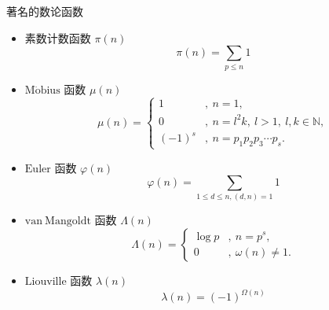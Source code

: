 \begin{example}{著名的数论函数}
\begin{itemize}
\item 素数计数函数 $\pi(n)$
\begin{equation}
\pi(n)=\sum_{p\leq n} 1
\end{equation}
\item $\mathrm{M\ddot{o}bius}$ 函数 $\mu(n)$
\begin{equation}
\mu(n)=
\begin{cases}
1&,\ n=1,\\
0&,\ n=l^2k,\ l>1,\ l,k\in\mathbb{N},\\
(-1)^s&,\ n=p_1p_2p_3\cdots p_s.
\end{cases}
\end{equation}
\item $\mathrm{Euler}$ 函数 $\varphi(n)$
\begin{equation}
\varphi(n)=\sum_{1\leq d\leq n,(d,n)=1}1
\end{equation}
\item $\mathrm{van\ Mangoldt}$ 函数 $\Lambda(n)$
\begin{equation}
\varLambda(n)=
\begin{cases}
\log p&,\ n=p^s,\\
0&,\ \omega(n)\neq 1.
\end{cases}
\end{equation}
\item $\mathrm{Liouville}$ 函数 $\lambda(n)$
\begin{equation}
\lambda(n)=(-1)^{\Omega(n)}
\end{equation}
\end{itemize}

\end{example}